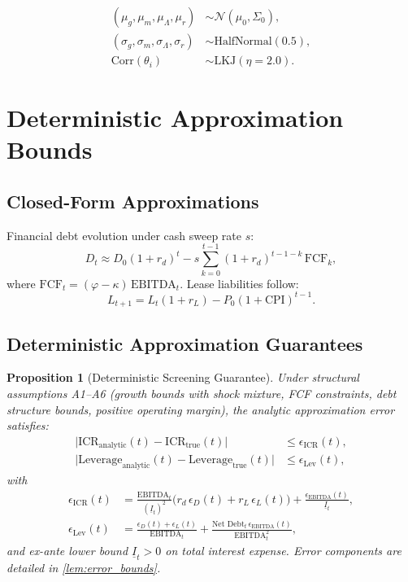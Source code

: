 \documentclass[11pt,a4paper]{article}
\numberwithin{equation}{section}
\theoremstyle{plain}
\newtheorem{proposition}{Proposition}
\theoremstyle{definition}
\begin{document}
\begin{align}
(\mu_g,\mu_m,\mu_\Lambda,\mu_r) &\sim \mathcal{N}(\mu_0,\Sigma_0), \\
(\sigma_g,\sigma_m,\sigma_\Lambda,\sigma_r) &\sim \text{HalfNormal}(0.5), \\
\text{Corr}(\theta_i) &\sim \text{LKJ}(\eta=2.0).
\end{align}

\section{Deterministic Approximation Bounds}

\subsection{Closed-Form Approximations}

Financial debt evolution under cash sweep rate $s$:
\begin{equation}
D_t \approx D_0(1+r_d)^t - s \sum_{k=0}^{t-1} (1+r_d)^{t-1-k}\,\text{FCF}_k,
\end{equation}
where $\text{FCF}_t = (\varphi-\kappa)\,\text{EBITDA}_t$. Lease liabilities follow:
\begin{equation}
L_{t+1} = L_t(1+r_L) - P_0(1+\text{CPI})^{t-1}.
\end{equation}

\subsection{Deterministic Approximation Guarantees}

\begin{proposition}[Deterministic Screening Guarantee]\label{prop:screening}
Under structural assumptions A1--A6 (growth bounds with shock mixture, FCF constraints, debt structure bounds, positive operating margin), the analytic approximation error satisfies:
\begin{align}
\bigl|\text{ICR}_{\text{analytic}}(t) - \text{ICR}_{\text{true}}(t)\bigr| &\le \epsilon_{\text{ICR}}(t), \\
\bigl|\text{Leverage}_{\text{analytic}}(t) - \text{Leverage}_{\text{true}}(t)\bigr| &\le \epsilon_{\text{Lev}}(t),
\end{align}
with
\begin{align}
\epsilon_{\text{ICR}}(t) &= \frac{\text{EBITDA}_t}{(\underline{I}_t)^2}\bigl(r_d\,\epsilon_D(t)+r_L\,\epsilon_L(t)\bigr) + \frac{\epsilon_{\text{EBITDA}}(t)}{\underline{I}_t}, \\
\epsilon_{\text{Lev}}(t) &= \frac{\epsilon_D(t)+\epsilon_L(t)}{\text{EBITDA}_t} + \frac{\text{Net Debt}_t\,\epsilon_{\text{EBITDA}}(t)}{\text{EBITDA}_t^2},
\end{align}
and ex-ante lower bound $\underline{I}_t>0$ on total interest expense. Error components are detailed in \cref{lem:error_bounds}.
\end{proposition}
\end{document}
